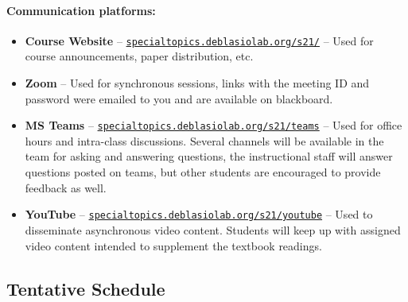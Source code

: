 \documentclass[12pt]{scrartcl}
\begin{document}
\paragraph{Communication platforms:}
\begin{itemize}
\item \textbf{Course Website} -- \href{https://specialtopics.deblasiolab.org/s21/}{\texttt{specialtopics.deblasiolab.org/s21/}} -- Used for course announcements, paper distribution, etc. 
\item \textbf{Zoom}  -- Used for synchronous sessions, links with the meeting ID and password were emailed to you and are available on blackboard. 
\item \textbf{MS Teams} -- \href{https://specialtopics.deblasiolab.org/s21/teams}{\texttt{specialtopics.deblasiolab.org/s21/teams}}  -- Used for office hours and intra-class discussions. Several channels will be available in the team for asking and answering questions, the instructional staff will answer questions posted on teams, but other students are encouraged to provide feedback as well. 
\item \textbf{YouTube} -- \href{https://specialtopics.deblasiolab.org/s21/youtube}{\texttt{specialtopics.deblasiolab.org/s21/youtube}} -- Used to disseminate asynchronous video content. Students will keep up with assigned video content intended to supplement the textbook readings.
\end{itemize}
 
\clearpage
 
\subsection{Tentative Schedule}
\end{document}
